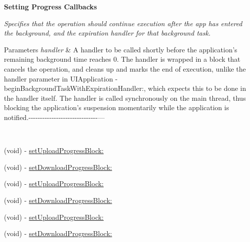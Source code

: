 \begin{Indent}\textbf{ Setting Progress Callbacks}\par
{\em Specifies that the operation should continue execution after the app has entered the background, and the expiration handler for that background task.


\begin{DoxyParams}{Parameters}
{\em handler} & A handler to be called shortly before the application’s remaining background time reaches 0. The handler is wrapped in a block that cancels the operation, and cleans up and marks the end of execution, unlike the {\ttfamily handler} parameter in {\ttfamily U\+I\+Application -\/begin\+Background\+Task\+With\+Expiration\+Handler\+:}, which expects this to be done in the handler itself. The handler is called synchronously on the main thread, thus blocking the application’s suspension momentarily while the application is notified.-\/-\/-\/-\/-\/-\/-\/-\/-\/-\/-\/-\/-\/-\/-\/-\/-\/-\/-\/-\/-\/-\/-\/-\/-\/-\/-\/-\/-\/-\/--- 

 \\
\hline
\end{DoxyParams}
}\begin{DoxyCompactItemize}
\item 
(void) -\/ \mbox{\hyperlink{interface_a_f_u_r_l_connection_operation_a96a234d5491685170008b96f6fd01afb}{set\+Upload\+Progress\+Block\+:}}
\item 
(void) -\/ \mbox{\hyperlink{interface_a_f_u_r_l_connection_operation_a0a6df99ee90311173f0a55248ccf19cb}{set\+Download\+Progress\+Block\+:}}
\item 
(void) -\/ \mbox{\hyperlink{interface_a_f_u_r_l_connection_operation_a96a234d5491685170008b96f6fd01afb}{set\+Upload\+Progress\+Block\+:}}
\item 
(void) -\/ \mbox{\hyperlink{interface_a_f_u_r_l_connection_operation_a0a6df99ee90311173f0a55248ccf19cb}{set\+Download\+Progress\+Block\+:}}
\item 
(void) -\/ \mbox{\hyperlink{interface_a_f_u_r_l_connection_operation_a96a234d5491685170008b96f6fd01afb}{set\+Upload\+Progress\+Block\+:}}
\item 
(void) -\/ \mbox{\hyperlink{interface_a_f_u_r_l_connection_operation_a0a6df99ee90311173f0a55248ccf19cb}{set\+Download\+Progress\+Block\+:}}
\end{DoxyCompactItemize}
\end{Indent}

